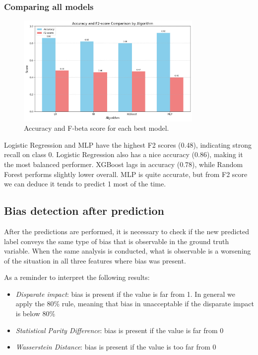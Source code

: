 \documentclass{article}
\begin{document}
\subsubsection{Comparing all models}
\begin{figure}[H]
  \centering
  \includegraphics[width=0.8\textwidth]{model_comparison.png}
  \caption{Accuracy and F-beta score for each best model.}
  \label{fig:model_comparison}
\end{figure}
Logistic Regression and MLP have the highest F2 scores (0.48), indicating strong recall on class 0. Logistic Regression also has a nice accuracy (0.86), making it the most balanced performer. XGBoost lags in accuracy (0.78), while Random Forest performs slightly lower overall. MLP is quite accurate, but from F2 score we can deduce it tends to predict 1 most of the time.
\subsection{Bias detection after prediction}
After the predictions are performed, it is necessary to check if the new predicted label conveys the same type of bias that is observable in the ground truth variable. When the same analysis is conducted, what is observable is a worsening of the situation in all three features where bias was present. 

As a reminder to interpret the following results:
\begin{itemize}
    \item \textit{Disparate impact}: bias is present if the value is far from 1. In general we apply the 80\% rule, meaning that bias in unacceptable if the disparate impact is below 80\%
    \item \textit{Statistical Parity Difference}: bias is present if the value is far from 0
    \item \textit{Wasserstein Distance}: bias is present if the value is too far from 0
\end{itemize}
\end{document}

